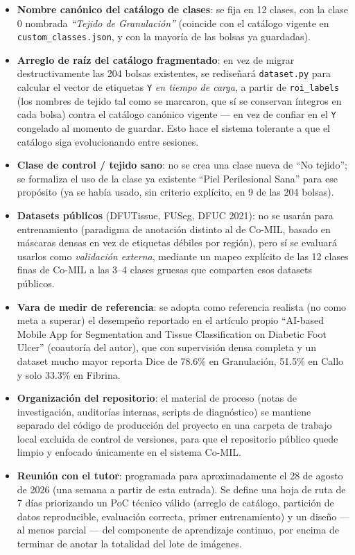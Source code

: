 \documentclass[12pt,letterpaper]{report}
\begin{document}
\begin{itemize}[leftmargin=1.5em]
    \item \textbf{Nombre canónico del catálogo de clases}: se fija en 12 clases, con la clase 0
        nombrada \emph{``Tejido de Granulación''} (coincide con el catálogo vigente en
        \texttt{custom\_classes.json}, y con la mayoría de las bolsas ya guardadas).
    \item \textbf{Arreglo de raíz del catálogo fragmentado}: en vez de migrar destructivamente las
        204 bolsas existentes, se rediseñará \texttt{dataset.py} para calcular el vector de
        etiquetas \texttt{Y} \emph{en tiempo de carga}, a partir de \texttt{roi\_labels} (los
        nombres de tejido tal como se marcaron, que sí se conservan íntegros en cada bolsa) contra
        el catálogo canónico vigente --- en vez de confiar en el \texttt{Y} congelado al momento de
        guardar. Esto hace el sistema tolerante a que el catálogo siga evolucionando entre
        sesiones.
    \item \textbf{Clase de control / tejido sano}: no se crea una clase nueva de ``No tejido''; se
        formaliza el uso de la clase ya existente ``Piel Perilesional Sana'' para ese propósito (ya
        se había usado, sin criterio explícito, en 9 de las 204 bolsas).
    \item \textbf{Datasets públicos} (DFUTissue, FUSeg, DFUC 2021): no se usarán para entrenamiento
        (paradigma de anotación distinto al de Co-MIL, basado en máscaras densas en vez de
        etiquetas débiles por región), pero sí se evaluará usarlos como \emph{validación externa},
        mediante un mapeo explícito de las 12 clases finas de Co-MIL a las 3--4 clases gruesas que
        comparten esos datasets públicos.
    \item \textbf{Vara de medir de referencia}: se adopta como referencia realista (no como meta a
        superar) el desempeño reportado en el artículo propio ``AI-based Mobile App for
        Segmentation and Tissue Classification on Diabetic Foot Ulcer'' (coautoría del autor),
        que con supervisión densa completa y un dataset mucho mayor reporta Dice de 78.6\% en
        Granulación, 51.5\% en Callo y solo 33.3\% en Fibrina.
    \item \textbf{Organización del repositorio}: el material de proceso (notas de investigación,
        auditorías internas, scripts de diagnóstico) se mantiene separado del código de producción
        del proyecto en una carpeta de trabajo local excluida de control de versiones, para que el
        repositorio público quede limpio y enfocado únicamente en el sistema Co-MIL.
    \item \textbf{Reunión con el tutor}: programada para aproximadamente el 28 de agosto de 2026
        (una semana a partir de esta entrada). Se define una hoja de ruta de 7 días priorizando un
        PoC técnico válido (arreglo de catálogo, partición de datos reproducible, evaluación
        correcta, primer entrenamiento) y un diseño --- al menos parcial --- del componente de
        aprendizaje continuo, por encima de terminar de anotar la totalidad del lote de imágenes.
\end{itemize}
\end{document}
